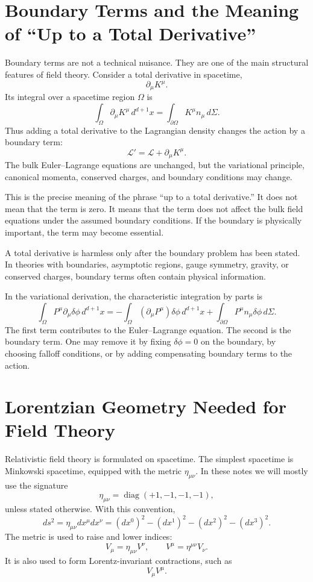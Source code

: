 \section{Boundary Terms and the Meaning of ``Up to a Total Derivative''}

Boundary terms are not a technical nuisance. They are one of the main structural
features of field theory. Consider a total derivative in spacetime,
\[
    \partial_\mu K^\mu.
\]
Its integral over a spacetime region \(\Omega\) is
\[
    \int_\Omega \partial_\mu K^\mu\,d^{d+1}x
    = \int_{\partial\Omega} K^\mu n_\mu\,d\Sigma.
\]
Thus adding a total derivative to the Lagrangian density changes the action by a
boundary term:
\[
    \mathcal{L}' = \mathcal{L}+\partial_\mu K^\mu.
\]
The bulk Euler--Lagrange equations are unchanged, but the variational principle,
canonical momenta, conserved charges, and boundary conditions may change.

This is the precise meaning of the phrase ``up to a total derivative.'' It does
not mean that the term is zero. It means that the term does not affect the bulk
field equations under the assumed boundary conditions. If the boundary is
physically important, the term may become essential.

\begin{remarkbox}
A total derivative is harmless only after the boundary problem has been stated.
In theories with boundaries, asymptotic regions, gauge symmetry, gravity, or
conserved charges, boundary terms often contain physical information.
\end{remarkbox}

In the variational derivation, the characteristic integration by parts is
\[
    \int_\Omega P^\mu\partial_\mu\delta\phi\,d^{d+1}x
    = -\int_\Omega (\partial_\mu P^\mu)\delta\phi\,d^{d+1}x
      + \int_{\partial\Omega} P^\mu n_\mu\delta\phi\,d\Sigma.
\]
The first term contributes to the Euler--Lagrange equation. The second is the
boundary term. One may remove it by fixing \(\delta\phi=0\) on the boundary, by
choosing falloff conditions, or by adding compensating boundary terms to the
action.

\section{Lorentzian Geometry Needed for Field Theory}

Relativistic field theory is formulated on spacetime. The simplest spacetime is
Minkowski spacetime, equipped with the metric \(\eta_{\mu\nu}\). In these notes
we will mostly use the signature
\[
    \eta_{\mu\nu}=\operatorname{diag}(+1,-1,-1,-1),
\]
unless stated otherwise. With this convention,
\[
    ds^2 = \eta_{\mu\nu}dx^\mu dx^\nu
    = (dx^0)^2 - (dx^1)^2 - (dx^2)^2 - (dx^3)^2.
\]
The metric is used to raise and lower indices:
\[
    V_\mu = \eta_{\mu\nu}V^\nu,
    \qquad
    V^\mu = \eta^{\mu\nu}V_\nu.
\]
It is also used to form Lorentz-invariant contractions, such as
\[
    V_\mu V^\mu.
\]

